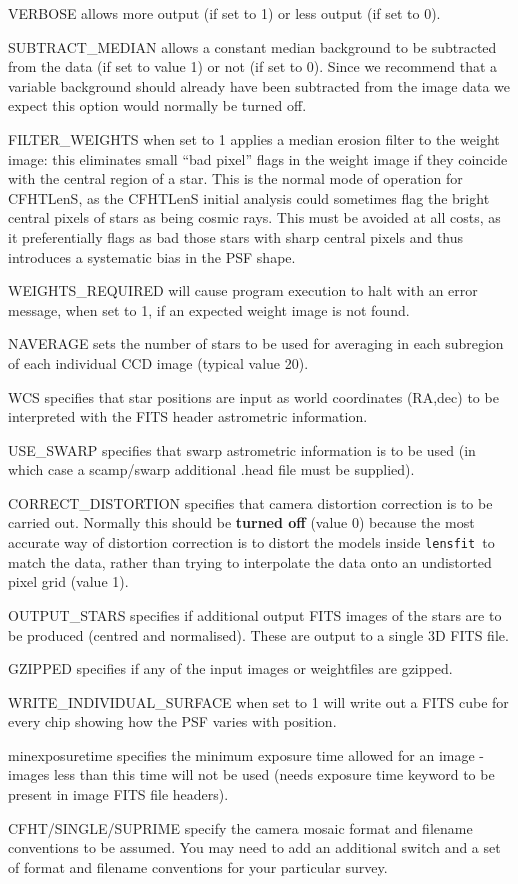 \documentclass{article}
\def\lensfit{{\tt lensfit}\ }
\begin{document}
\begin{list}{}{\itemsep=0mm \leftmargin=5mm}
\item VERBOSE allows more output (if set to 1) or less output (if set to 0).
\item SUBTRACT\_MEDIAN allows a constant median background to  be subtracted from the data (if set to 
value 1) or not (if set to 0). Since we recommend that a variable background should already have been 
subtracted from the image data we expect this option would normally be turned off. 
\item FILTER\_WEIGHTS when set to 1 applies a median erosion filter to the weight image: this eliminates
small ``bad pixel'' flags in the weight image if they coincide with the central region of a star.  This
is the normal mode of operation for CFHTLenS, as the CFHTLenS initial analysis could sometimes flag
the bright central pixels of stars as being cosmic rays.  This must be avoided at all costs, as it
preferentially flags as bad those stars with sharp central pixels and thus introduces a systematic
bias in the PSF shape.  
\item WEIGHTS\_REQUIRED will cause program execution to halt with an error message, 
when set to 1, if an expected weight image is not found.
\item NAVERAGE sets the number of stars to be used for averaging in each subregion of each individual CCD 
image (typical value 20). 
\item WCS specifies that star positions are input as world coordinates (RA,dec) to be interpreted with the 
FITS header astrometric information. 
\item USE\_SWARP specifies that swarp astrometric information is to be used (in which case a scamp/swarp 
additional .head file must be supplied). 
\item CORRECT\_DISTORTION specifies that camera 
distortion correction is to be carried out.  Normally this should be {\bf turned off} (value 0) because the most
accurate way of distortion correction is to distort the models inside \lensfit to match the data,
rather than trying to interpolate the data onto an undistorted pixel grid (value 1).
\item OUTPUT\_STARS specifies if additional output FITS images of the stars are to be produced (centred 
and normalised). These are output to a single 3D FITS file. 
\item GZIPPED specifies if any of the input images or weightfiles are gzipped. 
\item WRITE\_INDIVIDUAL\_SURFACE when set to 1 will write out a FITS cube for every chip showing
how the PSF varies with position.
\item minexposuretime specifies the minimum exposure time allowed for an image - images less than 
this time will not be used (needs exposure time keyword to be present in image FITS file headers).
\item CFHT/SINGLE/SUPRIME specify the camera mosaic format and filename conventions to be assumed.
You may need to add an additional switch and a set of format and filename conventions for your particular survey. 
\end{list}
\end{document}
